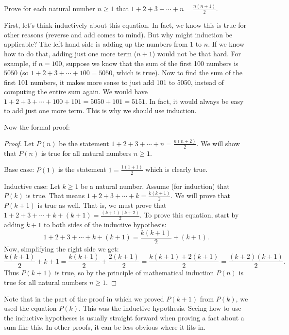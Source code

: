 \documentclass[12pt]{article}
\begin{document}
\begin{example}
  Prove for each natural number $n \ge 1$ that $1 + 2 + 3 + \cdots + n = \frac{n(n+1)}{2}$.

  \begin{solution}
	First, let's think inductively about this equation.  In fact, we know this is true for other reasons (reverse and add comes to mind).  But why might induction be applicable?  The left hand side is adding up the numbers from 1 to $n$.  If we know how to do that, adding just one more term ($n+1$) would not be that hard.  For example, if $n = 100$, suppose we know that the sum of the first 100 numbers is $5050$ (so $1 + 2 + 3 + \cdots + 100 = 5050$, which is true).  Now to find the sum of the first 101 numbers, it makes more sense to just add 101 to 5050, instead of computing the entire sum again.  We would have $1 + 2 + 3 + \cdots + 100 + 101 = 5050 + 101 = 5151$.  In fact, it would always be easy to add just one more term.  This is why we should use induction.

	Now the formal proof:
  \begin{proof}
    Let $P(n)$ be the statement $1 + 2 + 3 + \cdots + n = \frac{n(n+2)}{2}$.  We will show that $P(n)$ is true for all natural numbers $n \ge 1$.

    Base case: $P(1)$ is the statement $1 = \frac{1(1+1)}{2}$ which is clearly true.

    Inductive case: Let $k \ge 1$ be a natural number.  Assume (for induction) that $P(k)$ is true.  That means $1 + 2 + 3 + \cdots + k = \frac{k(k+1)}{2}$.  We will prove that $P(k+1)$ is true as well.  That is, we must prove that $1 + 2 + 3 + \cdots + k + (k+1) = \frac{(k+1)(k+2)}{2}$.  To prove this equation, start by adding $k+1$ to both sides of the inductive hypothesis:
    \[1 + 2 + 3 + \cdots + k + (k+1) = \frac{k(k+1)}{2} + (k+1).\]
    Now, simplifying the right side we get:
    \[\frac{k(k+1)}{2} + k+1 = \frac{k(k+1)}{2} + \frac{2(k+1)}{2} = \frac{k(k+1) + 2(k+1)}{2} = \frac{(k+2)(k+1)}{2}.\]
    Thus $P(k+1)$ is true, so by the principle of mathematical induction $P(n)$ is true for all natural numbers $n \ge 1$.
  \end{proof}

    \end{solution}
\end{example}

 Note that in the part of the proof in which we proved $P(k+1)$ from $P(k)$, we used the equation $P(k)$.  This was the inductive hypothesis.  Seeing how to use the inductive hypotheses is usually straight forward when proving a fact about a sum like this.  In other proofs, it can be less obvious where it fits in.
\end{document}

